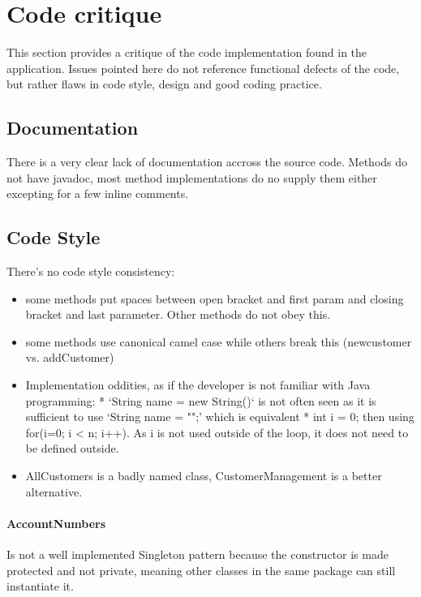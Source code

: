 \pagebreak
\section{Code critique}
\label{app:code-critique}

This section provides a critique of the code implementation found in the application. Issues pointed here do not reference functional defects of the code, but rather flaws in code style, design and good coding practice. 

\subsection{Documentation}
There is a very clear lack of documentation accross the source code. Methods do not have javadoc, most method implementations do no supply them either excepting for a few inline comments. 

\subsection{Code Style}
There's no code style consistency: 
\begin{itemize}
    \item some methods put spaces between open bracket and first param and closing bracket and last parameter. Other methods do not obey this. 
    \item some methods use canonical camel case while others break this (newcustomer vs. addCustomer)
    \item Implementation oddities, as if the developer is not familiar with Java programming: 
        * `String name = new String()` is not often seen as it is sufficient to use `String name = "";' which is equivalent
        * int i = 0; then using for(i=0; i < n; i++). As i is not used outside of the loop, it does not need to be defined outside. 
    \item AllCustomers is a badly named class, CustomerManagement is a better alternative. 
\end{itemize}
\paragraph{AccountNumbers}
Is not a well implemented Singleton pattern because the constructor is made protected and not private, meaning other classes in the same package can still instantiate it.
